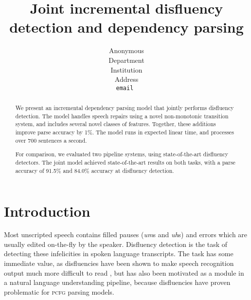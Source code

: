 \documentclass[11pt,letterpaper]{article}
\title{Joint incremental disfluency detection and dependency parsing}
\author{
	Anonymous\\
  	Department\\
  	Institution\\
  	Address\\
  {\tt \small email }\\
}
\date{}
\newcommand{\pcfg}{\textsc{pcfg}\xspace}
\begin{document}
\maketitle
\begin{abstract}

We present an incremental dependency parsing model that jointly performs
disfluency detection.  The model handles speech repairs using a novel non-monotonic
transition system, and includes several novel classes of features.  Together, these
additions improve parse accuracy by 1\%.  The model runs in expected linear time,
and processes over 700 sentences a second.

For comparison, we evaluated two pipeline systems, using state-of-the-art disfluency
detectors.  The joint model achieved state-of-the-art results on both tasks,
with a parse accuracy of 91.5\% and 84.0\% accuracy at disfluency detection.

\end{abstract}

\section{Introduction}

Most unscripted speech contains filled pauses (\emph{um}s and \emph{uh}s) and
errors which are usually edited on-the-fly by the speaker. Disfluency detection
is the task of detecting these infelicities in spoken language transcripts. The
task has some immediate value, as disfluencies have been shown to make speech
recognition output much more difficult to read \citep{jones:03}, but has also
been motivated as a module in a natural language understanding pipeline, because
disfluencies have proven problematic for \pcfg parsing models.


\end{document}

